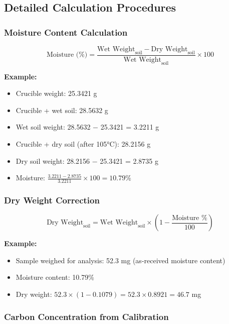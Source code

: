 \documentclass[11pt,a4paper]{article}\usepackage[]{graphicx}\usepackage[]{xcolor}
\begin{document}
\subsection{Detailed Calculation Procedures}

\subsubsection{Moisture Content Calculation}
\begin{equation}
\text{Moisture (\%)} = \frac{\text{Wet Weight}_{\text{soil}} - \text{Dry Weight}_{\text{soil}}}{\text{Wet Weight}_{\text{soil}}} \times 100
\end{equation}

\textbf{Example:}
\begin{itemize}[noitemsep]
    \item Crucible weight: 25.3421 g
    \item Crucible + wet soil: 28.5632 g
    \item Wet soil weight: 28.5632 $-$ 25.3421 = 3.2211 g
    \item Crucible + dry soil (after 105°C): 28.2156 g
    \item Dry soil weight: 28.2156 $-$ 25.3421 = 2.8735 g
    \item Moisture: $\frac{3.2211 - 2.8735}{3.2211} \times 100 = 10.79\%$
\end{itemize}

\subsubsection{Dry Weight Correction}
\begin{equation}
\text{Dry Weight}_{\text{soil}} = \text{Wet Weight}_{\text{soil}} \times \left(1 - \frac{\text{Moisture \%}}{100}\right)
\end{equation}

\textbf{Example:}
\begin{itemize}[noitemsep]
    \item Sample weighed for analysis: 52.3 mg (as-received moisture content)
    \item Moisture content: 10.79\%
    \item Dry weight: $52.3 \times (1 - 0.1079) = 52.3 \times 0.8921 = 46.7$ mg
\end{itemize}

\subsubsection{Carbon Concentration from Calibration}
\end{document}
